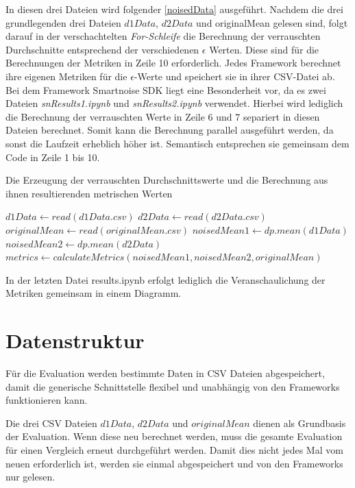 In diesen drei Dateien wird folgender \cref{noisedData} ausgeführt.
Nachdem die drei grundlegenden drei Dateien $d1Data$, $d2Data$ und originalMean gelesen sind, folgt darauf in der verschachtelten \textit{For-Schleife} die Berechnung der verrauschten Durchschnitte entsprechend der verschiedenen $\epsilon$ Werten. Diese sind für die Berechnungen der Metriken in Zeile 10 erforderlich. Jedes Framework berechnet ihre eigenen Metriken für die $\epsilon$-Werte und speichert sie in ihrer CSV-Datei ab. Bei dem Framework Smartnoise SDK liegt eine Besonderheit vor, da es zwei Dateien \textit{snResults1.ipynb} und \textit{snResults2.ipynb} verwendet. Hierbei wird lediglich die Berechnung der verrauschten Werte in Zeile 6 und 7 separiert in diesen Dateien berechnet. Somit kann die Berechnung parallel ausgeführt werden, da sonst die Laufzeit erheblich höher ist. Semantisch entsprechen sie gemeinsam dem Code in Zeile 1 bis 10.
\begin{algorithm}[t]
	\caption{Die Erzeugung der verrauschten Durchschnittswerte und die Berechnung aus ihnen resultierenden metrischen Werten}\label{noisedData}
	\begin{algorithmic}[1]
		\State $d1Data\gets read(d1Data.csv)$
		\State $d2Data\gets read(d2Data.csv)$
		\State $originalMean\gets read(originalMean.csv)$
		\State $noisedMean1\gets  dp.mean(d1Data)$
		\State $noisedMean2\gets  dp.mean(d2Data)$
		\EndFor
		\EndFor
		\State $metrics\gets calculateMetrics(noisedMean1,noisedMean2,originalMean)$
	\end{algorithmic}
\end{algorithm}
In der letzten Datei results.ipynb erfolgt lediglich die Veranschaulichung der Metriken gemeinsam in einem Diagramm. 

\section{Datenstruktur}
Für die Evaluation werden bestimmte Daten in CSV Dateien abgespeichert, damit die generische Schnittstelle flexibel und unabhängig von den Frameworks funktionieren kann.

Die drei CSV Dateien $d1Data$, $d2Data$ und $originalMean$ dienen als Grundbasis der Evaluation. Wenn diese neu berechnet werden, muss die gesamte Evaluation für einen Vergleich erneut durchgeführt werden. Damit dies nicht jedes Mal vom neuen erforderlich ist, werden sie einmal abgespeichert und von den Frameworks nur gelesen.

